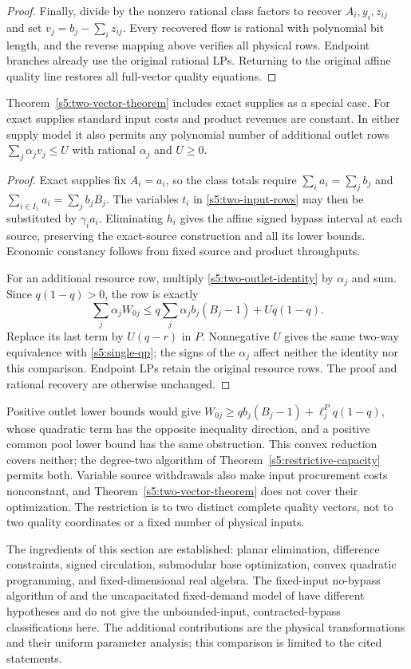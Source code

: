 \begin{proof}
Finally, divide by the nonzero rational class factors to recover
$A_i,y_i,z_{ij}$ and set $v_j=b_j-\sum_i z_{ij}$. Every recovered flow
is rational with polynomial bit length, and the reverse mapping above
verifies all physical rows. Endpoint branches already use the original
rational LPs. Returning to the original affine quality line restores
all full-vector quality equations.
\end{proof}

\begin{corollary}
\label{s5:two-vector-extensions}
Theorem~\ref{s5:two-vector-theorem} includes exact supplies as a special
case. For exact supplies standard input costs and product revenues are
constant. In either supply model it also permits any polynomial number
of additional outlet rows $\sum_j\alpha_jv_j\le U$ with rational
$\alpha_j$ and $U\ge0$.
\end{corollary}
\begin{proof}
Exact supplies fix $A_i=a_i$, so the class totals require
$\sum_i a_i=\sum_jb_j$ and $\sum_{i\in I_1}a_i=\sum_jb_jB_j$.
The variables $t_i$ in \eqref{s5:two-input-rows} may then be substituted
by $\gamma_i a_i$. Eliminating $h_i$ gives the affine signed bypass
interval at each source, preserving the exact-source construction and
all its lower bounds. Economic constancy follows from fixed source and
product throughputs.

For an additional resource row, multiply
\eqref{s5:two-outlet-identity} by $\alpha_j$ and sum. Since $q(1-q)>0$,
the row is exactly
\[
 \sum_j\alpha_jW_{0j}\le
 q\sum_j\alpha_jb_j(B_j-1)+Uq(1-q).
\]
Replace its last term by $U(q-r)$ in $P$. Nonnegative $U$ gives the
same two-way equivalence with \eqref{s5:single-qp}; the signs of the
$\alpha_j$ affect neither the identity nor this comparison. Endpoint LPs
retain the original resource rows. The proof and rational recovery are
otherwise unchanged.
\end{proof}

Positive outlet lower bounds would give
$W_{0j}\ge qb_j(B_j-1)+\ell_j^P q(1-q)$, whose quadratic term has the
opposite inequality direction, and a positive common pool lower bound has
the same obstruction. This convex reduction covers neither;
the degree-two algorithm of
Theorem~\ref{s5:restrictive-capacity} permits both. Variable source withdrawals also
make input procurement costs nonconstant, and
Theorem~\ref{s5:two-vector-theorem} does not cover their optimization.
The restriction is to two distinct complete quality vectors, not to two
quality coordinates or a fixed number of physical inputs.

The ingredients of this section are established: planar elimination,
difference constraints, signed circulation, submodular base optimization,
convex quadratic programming, and fixed-dimensional real algebra. The
fixed-input no-bypass algorithm of \citet[Theorem~1]{s4:boland2017} and
the uncapacitated fixed-demand model of
\citet[Assumption~2.2]{s3:baltean2018} have different hypotheses and do
not give the unbounded-input, contracted-bypass classifications here.
The additional contributions are the physical transformations and their
uniform parameter analysis; this comparison is limited to the cited
statements.

